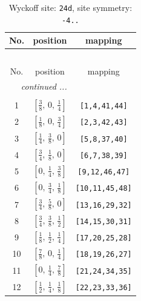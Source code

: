\documentclass[fleqn,8pt]{jsarticle}
\begin{document}
\begin{longtable}{ccc}
\caption{Wyckoff site: {\tt 24d}, site symmetry: {\tt -4..}}
 \\
 \hline \hline
No. & position & mapping \\ \hline \endfirsthead

\multicolumn{2}{l}{\tablename\ \thetable{}} \\
 \hline \hline
No. & position & mapping \\ \hline \endhead

 \hline \hline
\multicolumn{2}{r}{\footnotesize\it continued ...} \\ \endfoot

 \hline \hline
\multicolumn{2}{r}{} \\ \endlastfoot

1 & $\left[ \frac{3}{8},\, 0,\, \frac{1}{4} \right]$ & {\tt [1,4,41,44]} \\ \hline
2 & $\left[ \frac{1}{8},\, 0,\, \frac{3}{4} \right]$ & {\tt [2,3,42,43]} \\ \hline
3 & $\left[ \frac{1}{4},\, \frac{3}{8},\, 0 \right]$ & {\tt [5,8,37,40]} \\ \hline
4 & $\left[ \frac{3}{4},\, \frac{1}{8},\, 0 \right]$ & {\tt [6,7,38,39]} \\ \hline
5 & $\left[ 0,\, \frac{1}{4},\, \frac{3}{8} \right]$ & {\tt [9,12,46,47]} \\ \hline
6 & $\left[ 0,\, \frac{3}{4},\, \frac{1}{8} \right]$ & {\tt [10,11,45,48]} \\ \hline
7 & $\left[ \frac{3}{4},\, \frac{5}{8},\, 0 \right]$ & {\tt [13,16,29,32]} \\ \hline
8 & $\left[ \frac{3}{4},\, \frac{3}{8},\, \frac{1}{2} \right]$ & {\tt [14,15,30,31]} \\ \hline
9 & $\left[ \frac{1}{8},\, \frac{1}{2},\, \frac{1}{4} \right]$ & {\tt [17,20,25,28]} \\ \hline
10 & $\left[ \frac{7}{8},\, 0,\, \frac{1}{4} \right]$ & {\tt [18,19,26,27]} \\ \hline
11 & $\left[ 0,\, \frac{1}{4},\, \frac{7}{8} \right]$ & {\tt [21,24,34,35]} \\ \hline
12 & $\left[ \frac{1}{2},\, \frac{1}{4},\, \frac{1}{8} \right]$ & {\tt [22,23,33,36]} \\
\end{longtable}
\renewcommand{\arraystretch}{1.2}
\end{document}
